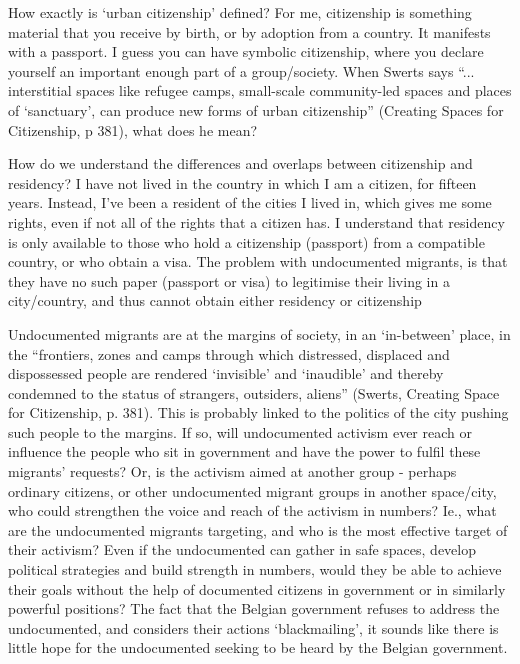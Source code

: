 \documentclass{article}
\begin{document}
\begin{outline}
	\1 How exactly is `urban citizenship' defined? For me, citizenship is something material that you receive by birth, or by adoption from a country. It manifests with a passport. I guess you can have symbolic citizenship, where you declare yourself an important enough part of a group/society. When Swerts says ``... interstitial spaces like refugee camps, small-scale community-led spaces and places of `sanctuary', can produce new forms of urban citizenship'' (Creating Spaces for Citizenship, p 381), what does he mean?
	
	\1 How do we understand the differences and overlaps between citizenship and residency? I have not lived in the country in which I am a citizen, for fifteen years. Instead, I've been a resident of the cities I lived in, which gives me some rights, even if not all of the rights that a citizen has. I understand that residency is only available to those who hold a citizenship (passport) from a compatible country, or who obtain a visa. 
	The problem with undocumented migrants, is that they have no such paper (passport or visa) to legitimise their living in a city/country, and thus cannot obtain either residency or citizenship
	
	\1 Undocumented migrants are at the margins of society, in an `in-between' place, in the ``frontiers, zones and camps through which distressed, displaced and dispossessed people are rendered `invisible' and `inaudible' and thereby condemned to the status of strangers, outsiders, aliens'' (Swerts, Creating Space for Citizenship, p. 381). 
	This is probably linked to the politics of the city pushing such people to the margins. If so, will undocumented activism ever reach or influence the people who sit in government and have the power to fulfil these migrants' requests? Or, is the activism aimed at another group - perhaps ordinary citizens, or other undocumented migrant groups in another space/city, who could strengthen the voice and reach of the activism in numbers?
	Ie., what are the undocumented migrants targeting, and who is the most effective target of their activism?
	Even if the undocumented can gather in safe spaces, develop political strategies and build strength in numbers, would they be able to achieve their goals without the help of documented citizens in government or in similarly powerful positions? The fact that the Belgian government refuses to address the undocumented, and considers their actions `blackmailing', it sounds like there is little hope for the undocumented seeking to be heard by the Belgian government.


\end{outline}
\end{document}
